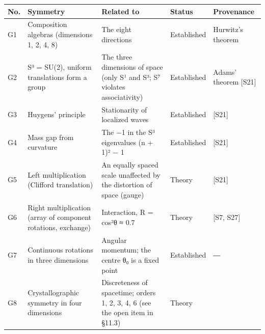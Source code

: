 \documentclass[
  a4paper,
]{article}
\newcounter{none} %
\begin{document}
{\def\LTcaptype{none} %
\begin{longtable}[]{@{}
  >{\raggedright\arraybackslash}p{}
  >{\raggedright\arraybackslash}p{}
  >{\raggedright\arraybackslash}p{}
  >{\raggedright\arraybackslash}p{}
  >{\raggedright\arraybackslash}p{}@{}}
\toprule\noalign{}
\begin{minipage}[b]{\linewidth}\raggedright
No.
\end{minipage} & \begin{minipage}[b]{\linewidth}\raggedright
Symmetry
\end{minipage} & \begin{minipage}[b]{\linewidth}\raggedright
Related to
\end{minipage} & \begin{minipage}[b]{\linewidth}\raggedright
Status
\end{minipage} & \begin{minipage}[b]{\linewidth}\raggedright
Provenance
\end{minipage} \\
\midrule\noalign{}
\endhead
\bottomrule\noalign{}
\endlastfoot
G1 & Composition algebras (dimensions 1, 2, 4, 8) & The eight directions
& Established & Hurwitz's theorem \\
G2 & S³ = SU(2), uniform translations form a group & The three
dimensions of space (only S¹ and S³; S⁷ violates associativity) &
Established & Adams' theorem {[}S21{]} \\
G3 & Huygens' principle & Stationarity of localized waves & Established
& {[}S21{]} \\
G4 & Mass gap from curvature & The −1 in the S³ eigenvalues (n + 1)² − 1
& Established & {[}S21{]} \\
G5 & Left multiplication (Clifford translation) & An equally spaced
scale unaffected by the distortion of space (gauge) & Theory &
{[}S21{]} \\
G6 & Right multiplication (array of component rotations, exchange) &
Interaction, R = cos²θ ≈ 0.7 & Theory & {[}S7, S27{]} \\
G7 & Continuous rotations in three dimensions & Angular momentum; the
centre θ₀ is a fixed point & Established & ― \\
G8 & Crystallographic symmetry in four dimensions & Discreteness of
spacetime; orders 1, 2, 3, 4, 6 (see the open item in §11.3) & Theory &

\end{longtable}}
\end{document}
